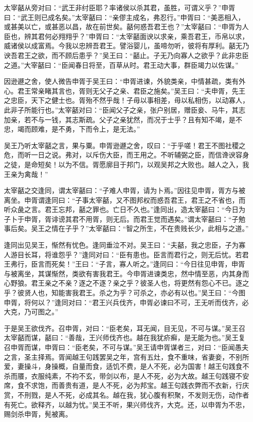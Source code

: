 \documentclass[12pt,UTF8]{ctexbook}
\begin{document}
太宰嚭从旁对曰：“武王非纣臣耶？率诸侯以杀其君，虽胜，可谓义乎？”申胥曰：“武王则已成名矣。”太宰嚭曰：“亲僇主成名，弗忍行。”申胥曰：“美恶相入，或甚美以亡，或甚恶以昌，故在前世矣。嚭何惑吾君王也？”太宰嚭曰：“申胥为人臣也，辨其君何必翙翙乎？”申胥曰：“太宰嚭面谀以求亲，乘吾君王，币帛以求，威诸侯以成富焉。今我以忠辨吾君王。譬浴婴儿，虽啼勿听，彼将有厚利。嚭无乃谀吾君王之欲，而不顾后患乎？”吴王曰：“嚭止。子无乃向寡人之欲乎？此非忠臣之道。”大宰嚭曰：“臣闻春日将至，百草从时。君王动大事，群臣竭力以佐谋。”

因逊遯之舍，使人微告申胥于吴王曰：“申胥进谏，外貌类亲，中情甚疏，类有外心。君王常亲睹其言也，胥则无父子之亲、君臣之施矣。”吴王曰：“夫申胥，先王之忠臣，天下之健士也。胥殆不然乎哉！子毋以事相差，毋以私相伤，以动寡人，此非子所能行也。”太宰嚭对曰：“臣闻父子之亲，张户别居，赠臣妾、马牛，其志加亲，若不与一钱，其志斯疏。父子之亲犹然，而况于士乎？且有知不竭，是不忠，竭而顾难，是不勇，下而令上，是无法。”

吴王乃听太宰嚭之言，果与粟。申胥逊遯之舍，叹曰：“于乎嗟！君王不图社稷之危，而听一日之说。弗对，以斥伤大臣，而王用之。不听辅弼之臣，而信谗谀容身之徒，是命短矣！以为不信。胥愿廓目于邦门，以观吴邦之大败也。越人之入，我王亲为禽哉！”

太宰嚭之交逢同，谓太宰嚭曰：“子难人申胥，请为卜焉。”因往见申胥，胥方与被离坐。申胥谓逢同曰：“子事太宰嚭，又不图邦权而惑吾君王，君王之不省也，而听众彘之言。君王忘邦，嚭之罪也。亡日不久也。”逢同出，造太宰嚭曰：“今日为子卜于申胥，胥诽谤其君不用胥，则无后。而君王觉而遇矣。”谓太宰嚭曰：“子勉事后矣。吴王之情在子乎？”太宰嚭曰：“智之所生，不在贵贱长少，此相与之道。”

逢同出见吴王，惭然有忧色。逢同垂泣不对。吴王曰：“夫嚭，我之忠臣，子为寡人游目长耳，将谁怨乎？”逢同对曰：“臣有患也。臣言而君行之，则无后忧。若君王弗行，臣言而死矣！”王曰：“子言，寡人听之。”逢同曰：“今日往见申胥，申胥与被离坐，其谋惭然，类欲有害我君王。今申胥进谏类忠，然中情至恶，内其身而心野狼。君王亲之不亲？逐之不逐？亲之乎？彼圣人也，将更然有怨心不已。逐之乎？彼贤人也，知能害我君王。杀之为乎？可杀之，亦必有以也。”吴王曰：“今图申胥，将何以？”逢同对曰：“君王兴兵伐齐，申胥必谏曰不可，王无听而伐齐，必大克，乃可图之。”

于是吴王欲伐齐。召申胥，对曰：“臣老矣，耳无闻，目无见，不可与谋。”吴王召太宰嚭而谋，嚭曰：“善哉，王兴师伐齐也。越在我犹疥癣，是无能为也。”吴王复召申胥而谋，申胥曰：“臣老矣，不可与谋。”吴王请申胥谋者三，对曰：“臣闻愚夫之言，圣主择焉。胥闻越王句践罢吴之年，宫有五灶，食不重味，省妻妾，不别所爱，妻操斗，身操概，自量而食，适饥不费，是人不死，必为国害！越王句践食不杀而餍，衣服纯素，不袀不玄，带剑以布，是人不死，必为大故。越王句践寝不安席，食不求饱，而善贵有道，是人不死，必为邦宝。越王句践衣弊而不衣新，行庆赏，不刑戮，是人不死，必成其名。越在我，犹心腹有积聚，不发则无伤，动作者有死亡。欲释齐，以越为忧。”吴王不听，果兴师伐齐，大克。还，以申胥为不忠，赐剑杀申胥，髡被离。
\end{document}
